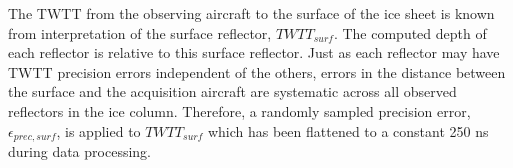 
The TWTT from the observing aircraft to the surface of the ice sheet is known from interpretation of the surface reflector, $TWTT_{surf}$. The computed depth of each reflector is relative to this surface reflector. Just as each reflector may have TWTT precision errors independent of the others, errors in the distance between the surface and the acquisition aircraft are systematic across all observed reflectors in the ice column. Therefore, a randomly sampled precision error, $\epsilon_{prec,surf}$, is applied to $TWTT_{surf}$ which has been flattened to a constant 250 ns during data processing. 








